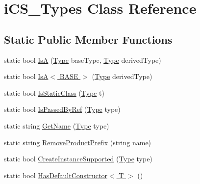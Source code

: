 \hypertarget{classi_c_s___types}{\section{i\+C\+S\+\_\+\+Types Class Reference}
\label{classi_c_s___types}
}
\subsection*{Static Public Member Functions}
\begin{DoxyCompactItemize}
\item 
static bool \hyperlink{classi_c_s___types_a4de42f5a4b19cf121e1404482e38a9f2}{Is\+A} (\hyperlink{i_c_s___object_type_enum_8cs_ae6c3dd6d8597380b56d94908eb431547aa1fa27779242b4902f7ae3bdd5c6d508}{Type} base\+Type, \hyperlink{i_c_s___object_type_enum_8cs_ae6c3dd6d8597380b56d94908eb431547aa1fa27779242b4902f7ae3bdd5c6d508}{Type} derived\+Type)
\item 
static bool \hyperlink{classi_c_s___types_ab7b44f960bf165cc41e170ab7311f740}{Is\+A$<$ B\+A\+S\+E $>$} (\hyperlink{i_c_s___object_type_enum_8cs_ae6c3dd6d8597380b56d94908eb431547aa1fa27779242b4902f7ae3bdd5c6d508}{Type} derived\+Type)
\item 
static bool \hyperlink{classi_c_s___types_a8357e610743cc1bfee554f7b0ea9990e}{Is\+Static\+Class} (\hyperlink{i_c_s___object_type_enum_8cs_ae6c3dd6d8597380b56d94908eb431547aa1fa27779242b4902f7ae3bdd5c6d508}{Type} t)
\item 
static bool \hyperlink{classi_c_s___types_a930db306beb5bc48de36682972323cc1}{Is\+Passed\+By\+Ref} (\hyperlink{i_c_s___object_type_enum_8cs_ae6c3dd6d8597380b56d94908eb431547aa1fa27779242b4902f7ae3bdd5c6d508}{Type} type)
\item 
static string \hyperlink{classi_c_s___types_a42fe954bc2467ea3c7f6a46f422d76f2}{Get\+Name} (\hyperlink{i_c_s___object_type_enum_8cs_ae6c3dd6d8597380b56d94908eb431547aa1fa27779242b4902f7ae3bdd5c6d508}{Type} type)
\item 
static string \hyperlink{classi_c_s___types_a454348b7315215485c9b496706e2e39d}{Remove\+Product\+Prefix} (string name)
\item 
static bool \hyperlink{classi_c_s___types_af0a8541a875620f4e5a061d24ce827e5}{Create\+Instance\+Supported} (\hyperlink{i_c_s___object_type_enum_8cs_ae6c3dd6d8597380b56d94908eb431547aa1fa27779242b4902f7ae3bdd5c6d508}{Type} type)
\item 
static bool \hyperlink{classi_c_s___types_a95ae4b91254fa0ed9e3bb606ae25e8c3}{Has\+Default\+Constructor$<$ T $>$} ()

\end{DoxyCompactItemize}
